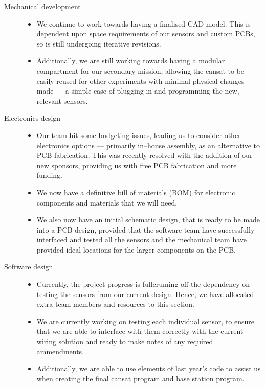 \documentclass{report}
\begin{document}
\begin{description}
		\item[Mechanical development] \hfill \begin{itemize}
			\item We continue to work towards having a finalised 
			CAD model. This is dependent upon space requirements of
			our sensors and custom PCBs, so is still undergoing iterative
			revisions.
			\item Additionally, we are still working towards having a modular
			compartment for our secondary mission, allowing the cansat to
			be easily reused for other experiments with minimal physical
			changes made --- a simple case of plugging in and programming
			the new, relevant sensors.
		\end{itemize}

		\item[Electronics design] \hfill \begin{itemize}
			\item Our team hit some budgeting issues, leading us to
			consider other electronics options --- primarily in--house 
			assembly, as an alternative to PCB fabrication. This was recently
			resolved with the addition of our new sponsors, providing us
			with free PCB fabrication and more funding.
			\item We now have a definitive bill of materials (BOM) for 
			electronic components and materials that we will need.
			\item We also now have an initial schematic design, that is 
			ready to be made into a PCB design, provided that the software
			team have successfully interfaced and tested all the sensors and
			the mechanical team have provided ideal locations for the larger
			components on the PCB.
		\end{itemize}

		\item[Software design] \hfill \begin{itemize}
			\item Currently, the project progress is fullcruming off the
			dependency on testing the sensors from our current design.
			Hence, we have allocated extra team members and 
			resources to this section.
			\item We are currently working on testing each individual sensor, 
			to ensure that we are able to interface with them correctly with
			the current wiring solution and ready to make notes of any required 
			ammendments.
			\item Additionally, we are able to use elements of last year's code
			to assist us when creating the final cansat program and base
			station program.
		\end{itemize}


\end{description}
\end{document}
